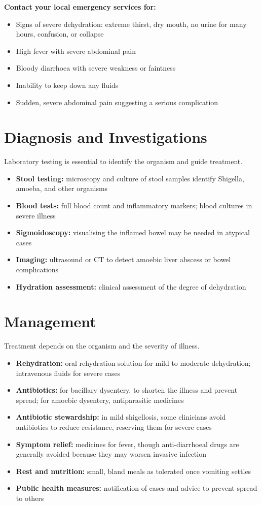 \textbf{Contact your local emergency services for:}
\begin{itemize}
    \item Signs of severe dehydration: extreme thirst, dry mouth, no urine for many hours, confusion, or collapse
    \item High fever with severe abdominal pain
    \item Bloody diarrhoea with severe weakness or faintness
    \item Inability to keep down any fluids
    \item Sudden, severe abdominal pain suggesting a serious complication
\end{itemize}

\section*{Diagnosis and Investigations}
Laboratory testing is essential to identify the organism and guide treatment.
\begin{itemize}
    \item \textbf{Stool testing:} microscopy and culture of stool samples identify Shigella, amoeba, and other organisms
    \item \textbf{Blood tests:} full blood count and inflammatory markers; blood cultures in severe illness
    \item \textbf{Sigmoidoscopy:} visualising the inflamed bowel may be needed in atypical cases
    \item \textbf{Imaging:} ultrasound or CT to detect amoebic liver abscess or bowel complications
    \item \textbf{Hydration assessment:} clinical assessment of the degree of dehydration
\end{itemize}

\section*{Management}
Treatment depends on the organism and the severity of illness.
\begin{itemize}
    \item \textbf{Rehydration:} oral rehydration solution for mild to moderate dehydration; intravenous fluids for severe cases
    \item \textbf{Antibiotics:} for bacillary dysentery, to shorten the illness and prevent spread; for amoebic dysentery, antiparasitic medicines
    \item \textbf{Antibiotic stewardship:} in mild shigellosis, some clinicians avoid antibiotics to reduce resistance, reserving them for severe cases
    \item \textbf{Symptom relief:} medicines for fever, though anti-diarrhoeal drugs are generally avoided because they may worsen invasive infection
    \item \textbf{Rest and nutrition:} small, bland meals as tolerated once vomiting settles
    \item \textbf{Public health measures:} notification of cases and advice to prevent spread to others
\end{itemize}

